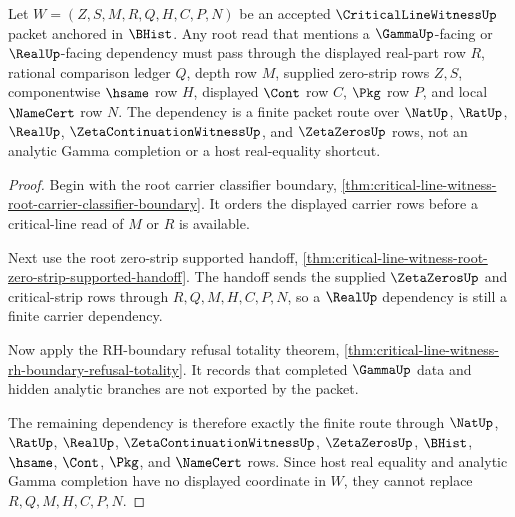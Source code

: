 \begin{theorem}
\label{thm:criticalline-witness-root-gamma-real-dependency}
Let $W=(Z,S,M,R,Q,H,C,P,N)$ be an accepted $\CriticalLineWitnessUp$ packet anchored in $\BHist$. Any root read that mentions a $\GammaUp$-facing or $\RealUp$-facing dependency must pass through the displayed real-part row $R$, rational comparison ledger $Q$, depth row $M$, supplied zero-strip rows $Z,S$, componentwise $\hsame$ row $H$, displayed $\Cont$ row $C$, $\Pkg$ row $P$, and local $\NameCert$ row $N$. The dependency is a finite packet route over $\NatUp$, $\RatUp$, $\RealUp$, $\ZetaContinuationWitnessUp$, and $\ZetaZerosUp$ rows, not an analytic Gamma completion or a host real-equality shortcut.
\end{theorem}
\begin{proof}
Begin with the root carrier classifier boundary, \autoref{thm:critical-line-witness-root-carrier-classifier-boundary}. It orders the displayed carrier rows before a critical-line read of $M$ or $R$ is available.

Next use the root zero-strip supported handoff, \autoref{thm:critical-line-witness-root-zero-strip-supported-handoff}. The handoff sends the supplied $\ZetaZerosUp$ and critical-strip rows through $R,Q,M,H,C,P,N$, so a $\RealUp$ dependency is still a finite carrier dependency.

Now apply the RH-boundary refusal totality theorem, \autoref{thm:critical-line-witness-rh-boundary-refusal-totality}. It records that completed $\GammaUp$ data and hidden analytic branches are not exported by the packet.

The remaining dependency is therefore exactly the finite route through $\NatUp$, $\RatUp$, $\RealUp$, $\ZetaContinuationWitnessUp$, $\ZetaZerosUp$, $\BHist$, $\hsame$, $\Cont$, $\Pkg$, and $\NameCert$ rows. Since host real equality and analytic Gamma completion have no displayed coordinate in $W$, they cannot replace $R,Q,M,H,C,P,N$.
\end{proof}

